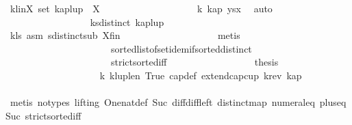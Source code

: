 \begin{isabellebody}
\ kl{\isacharunderscore}{\kern0pt}inX{\isacharcolon}{\kern0pt}\ {\isachardoublequoteopen}set\ {\isacharparenleft}{\kern0pt}kap{\isacharat}{\kern0pt}{\isacharbrackleft}{\kern0pt}lup{\isacharbang}{\kern0pt}{}{\isacharbrackright}{\kern0pt}{\isacharparenright}{\kern0pt}\ {\isasymsubseteq}\ X{\isachardoublequoteclose}\isanewline
\ \ \ \ \ \ \ \ \ \ \ \ \ \ \ \ \ \ \isamarkupfalse%
\ k{}\ kap{\isacharparenleft}{\kern0pt}{}{\isacharparenright}{\kern0pt}\ ysx\ \isamarkupfalse%
\ auto\isanewline
\ \ \ \ \ \ \ \ \ \ \ \ \ \ \ \ \isamarkupfalse%
\ k{}{}{\isacharcolon}{\kern0pt}{\isachardoublequoteopen}sdistinct\ {\isacharparenleft}{\kern0pt}kap{\isacharat}{\kern0pt}{\isacharbrackleft}{\kern0pt}lup{\isacharbang}{\kern0pt}{}{\isacharbrackright}{\kern0pt}{\isacharparenright}{\kern0pt}{\isachardoublequoteclose}\isanewline
\ \ \ \ \ \ \ \ \ \ \ \ \ \ \ \ \ \ \isamarkupfalse%
\ kl{\isacharunderscore}{\kern0pt}s\ asm{\isacharparenleft}{\kern0pt}{}{\isacharparenright}{\kern0pt}\ sdistinct{\isacharunderscore}{\kern0pt}sub\ X{\isacharunderscore}{\kern0pt}fin\isanewline
\ \ \ \ \ \ \ \ \ \ \ \ \ \ \ \ \ \ \isamarkupfalse%
\ {\isacharparenleft}{\kern0pt}metis\isanewline
\ \ \ \ \ \ \ \ \ \ \ \ \ \ \ \ \ \ \ \ \ \ sorted{\isacharunderscore}{\kern0pt}list{\isacharunderscore}{\kern0pt}of{\isacharunderscore}{\kern0pt}set{\isachardot}{\kern0pt}idem{\isacharunderscore}{\kern0pt}if{\isacharunderscore}{\kern0pt}sorted{\isacharunderscore}{\kern0pt}distinct\isanewline
\ \ \ \ \ \ \ \ \ \ \ \ \ \ \ \ \ \ \ \ \ \ strict{\isacharunderscore}{\kern0pt}sorted{\isacharunderscore}{\kern0pt}iff{\isacharparenright}{\kern0pt}\isanewline
\ \ \ \ \ \ \ \ \ \ \ \ \ \ \ \ \isamarkupfalse%
\ {\isacharquery}{\kern0pt}thesis\ \isanewline
\ \ \ \ \ \ \ \ \ \ \ \ \ \ \ \ \ \ \isamarkupfalse%
\ k{}{}\ k{\isacharunderscore}{\kern0pt}lup{\isacharunderscore}{\kern0pt}len\ True\ cap{\isacharunderscore}{\kern0pt}def\ extend{\isacharunderscore}{\kern0pt}cap{\isacharunderscore}{\kern0pt}cup\ k{\isacharunderscore}{\kern0pt}rev\ kap\isanewline
\ \ \ \ \ \ \ \ \ \ \ \ \ \ \ \ \ \ \isamarkupfalse%
\ {\isacharparenleft}{\kern0pt}metis\ {\isacharparenleft}{\kern0pt}no{\isacharunderscore}{\kern0pt}types{\isacharcomma}{\kern0pt}\ lifting{\isacharparenright}{\kern0pt}\ One{\isacharunderscore}{\kern0pt}nat{\isacharunderscore}{\kern0pt}def\ Suc{\isacharunderscore}{\kern0pt}{}\ diff{\isacharunderscore}{\kern0pt}diff{\isacharunderscore}{\kern0pt}left\ distinct{\isacharunderscore}{\kern0pt}map\ numeral{\isacharunderscore}{\kern0pt}{}{\isacharunderscore}{\kern0pt}eq{\isacharunderscore}{\kern0pt}{}\ plus{\isacharunderscore}{\kern0pt}{}{\isacharunderscore}{\kern0pt}eq{\isacharunderscore}{\kern0pt}Suc\ strict{\isacharunderscore}{\kern0pt}sorted{\isacharunderscore}{\kern0pt}iff{\isacharparenright}{\kern0pt}\isanewline

\end{isabellebody}
